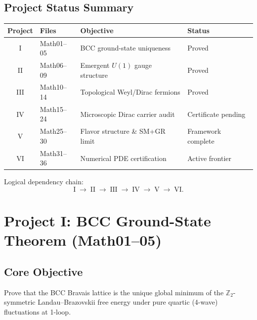 \documentclass[11pt,a4paper]{article}
\begin{document}
\subsection*{Project Status Summary}
\begin{center}
\renewcommand{\arraystretch}{1.45}
\begin{tabular}{clll}
\toprule
\textbf{Project} & \textbf{Files} & \textbf{Objective} & \textbf{Status} \\
\midrule
I   & Math01--05 & BCC ground-state uniqueness      & \textcolor{green!55!black}{Proved} \\
II  & Math06--09 & Emergent $U(1)$ gauge structure   & \textcolor{green!55!black}{Proved} \\
III & Math10--14 & Topological Weyl/Dirac fermions   & \textcolor{green!55!black}{Proved} \\
IV  & Math15--24 & Microscopic Dirac carrier audit   & \textcolor{orange!80!black}{Certificate pending} \\
V   & Math25--30 & Flavor structure \& SM+GR limit   & \textcolor{orange!80!black}{Framework complete} \\
VI  & Math31--36 & Numerical PDE certification       & \textcolor{red!70!black}{Active frontier} \\
\bottomrule
\end{tabular}
\end{center}

Logical dependency chain:
\begin{equation}
\text{I}\;\longrightarrow\;
\text{II}\;\longrightarrow\;
\text{III}\;\longrightarrow\;
\text{IV}\;\longrightarrow\;
\text{V}\;\longrightarrow\;
\text{VI}.
\end{equation}

\section{Project I: BCC Ground-State Theorem (Math01--05)}

\subsection{Core Objective}
Prove that the BCC Bravais lattice is the unique global minimum of the
$\mathbb{Z}_{2}$-symmetric Landau--Brazovskii free energy under pure quartic
(4-wave) fluctuations at 1-loop.
\end{document}
